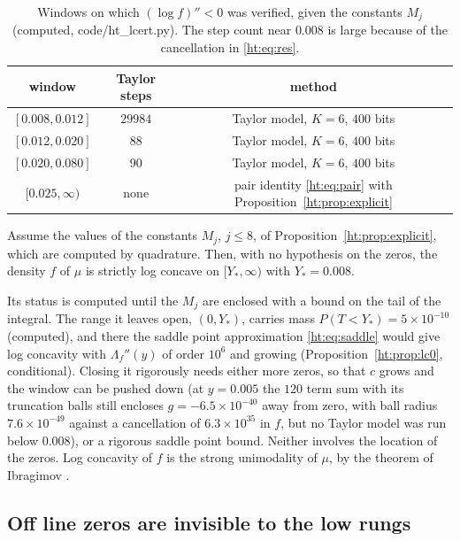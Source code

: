\begin{table}[ht]
\centering\small
\begin{tabular}{ccc}
\toprule
window & Taylor steps & method\\
\midrule
$[0.008,0.012]$ & $29984$ & Taylor model, $K=6$, $400$ bits\\
$[0.012,0.020]$ & $88$ & Taylor model, $K=6$, $400$ bits\\
$[0.020,0.080]$ & $90$ & Taylor model, $K=6$, $400$ bits\\
$[0.025,\infty)$ & none & pair identity \eqref{ht:eq:pair} with Proposition~\ref{ht:prop:explicit}\\
\bottomrule
\end{tabular}
\caption{Windows on which $(\log f)''<0$ was verified, given the constants $M_j$ (computed, code/ht\_lcert.py). The step count near $0.008$ is large because of the cancellation in \eqref{ht:eq:res}.}\label{ht:tab:cert}
\end{table}

\begin{theorem}\label{ht:thm:lc}
Assume the values of the constants $M_j$, $j\le8$, of Proposition~\ref{ht:prop:explicit}, which are computed by quadrature. Then, with no hypothesis on the zeros, the density $f$ of $\mu$ is strictly log concave on $[Y_{\!*},\infty)$ with $Y_{\!*}=0.008$.
\end{theorem}

Its status is computed until the $M_j$ are enclosed with a bound on the tail of the integral. The range it leaves open, $(0,Y_{\!*})$, carries mass $P(T<Y_{\!*})=5\times10^{-10}$ (computed), and there the saddle point approximation \eqref{ht:eq:saddle} would give log concavity with $\Lambda_f''(y)$ of order $10^6$ and growing (Proposition~\ref{ht:prop:lc0}, conditional). Closing it rigorously needs either more zeros, so that $c$ grows and the window can be pushed down (at $y=0.005$ the $120$ term sum with its truncation balls still encloses $g=-6.5\times10^{-40}$ away from zero, with ball radius $7.6\times10^{-49}$ against a cancellation of $6.3\times10^{35}$ in $f$, but no Taylor model was run below $0.008$), or a rigorous saddle point bound. Neither involves the location of the zeros. Log concavity of $f$ is the strong unimodality of $\mu$, by the theorem of Ibragimov \cite{Ibragimov56}.


\subsection{Off line zeros are invisible to the low rungs}

